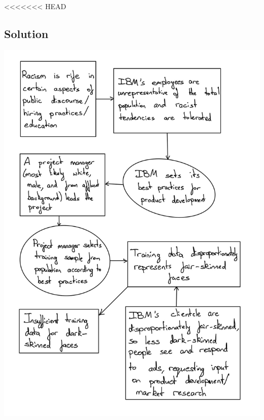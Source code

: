 \documentclass[submit]{harvardml}
\begin{document}
<<<<<<< HEAD
\subsection*{Solution}
\begin{center}
    \includegraphics[scale=0.3]{HW4/3.png}
\end{center}
\end{document}
